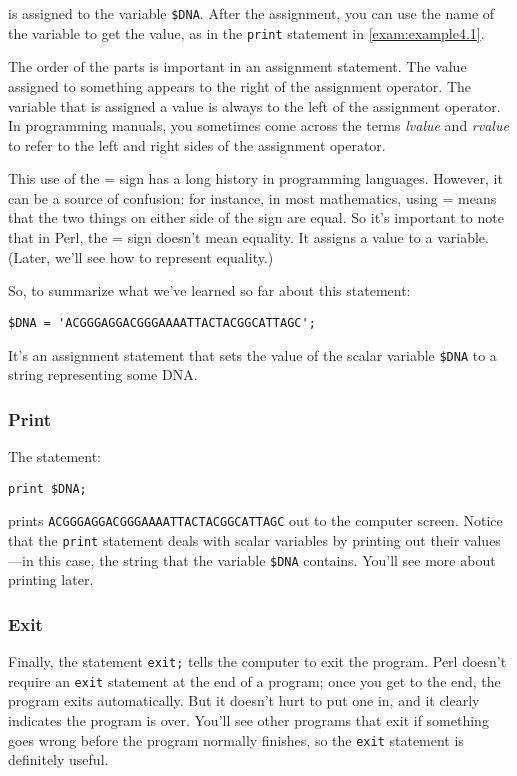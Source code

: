 is assigned to the variable \verb|$DNA|. After the assignment, you can use the name of the variable to get the value, as in the \verb|print| statement in \autoref{exam:example4.1}.  

The order of the parts is important in an assignment statement. The value assigned to something appears to the right of the assignment operator. The variable that is assigned a value is always to the left of the assignment operator. In programming manuals, you sometimes come across the terms \textit{lvalue} and \textit{rvalue} to refer to the left and right sides of the assignment operator.

This use of the = sign has a long history in programming languages. However, it can be a source of confusion: for instance, in most mathematics, using = means that the two things on either side of the sign are equal. So it's important to note that in Perl, the = sign doesn't mean equality. It assigns a value to a variable. (Later, we'll see how to represent equality.)

So, to summarize what we've learned so far about this statement:

\begin{lstlisting}
$DNA = 'ACGGGAGGACGGGAAAATTACTACGGCATTAGC';
\end{lstlisting}

It's an assignment statement that sets the value of the scalar variable \verb|$DNA| to a string representing some DNA. 

\subsubsection{Print}
The statement:

\begin{lstlisting}
print $DNA;
\end{lstlisting}

prints \verb|ACGGGAGGACGGGAAAATTACTACGGCATTAGC| out to the computer screen. Notice that the \verb|print| statement deals with scalar variables by printing out their values—in this case, the string that the variable \verb|$DNA| contains. You'll see more about printing later. 

\subsubsection{Exit}
Finally, the statement \verb|exit;| tells the computer to exit the program. Perl doesn't require an \verb|exit| statement at the end of a program; once you get to the end, the program exits automatically. But it doesn't hurt to put one in, and it clearly indicates the program is over. You'll see other programs that exit if something goes wrong before the program normally finishes, so the \verb|exit| statement is definitely useful. 

